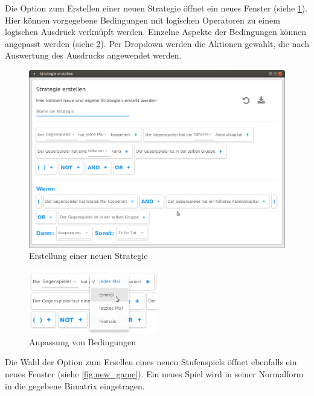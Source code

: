 \documentclass[parskip=full,11pt]{scrartcl}
\begin{document}
\newpage


Die Option zum Erstellen einer neuen \Gls{Strategie} öffnet ein neues Fenster (siehe \cref{fig:strategy}). Hier können vorgegebene Bedingungen mit logischen Operatoren zu einem logischen Ausdruck verknüpft werden. Einzelne Aspekte der Bedingungen können angepasst werden (siehe \cref{fig:strategy_drop}). Per Dropdown werden die Aktionen gewählt, die nach Auswertung des Ausdrucks angewendet werden.


\begin{figure}[hb]
	\centering
	\includegraphics[width=\textwidth]{images/strategy.png}
	\caption{\label{fig:strategy}
		Erstellung einer neuen \Gls{Strategie}}
\end{figure}


\begin{figure}[hb]
	\centering
	\includegraphics[width=0.5\textwidth]{images/strategy_drop.png}
	\caption{\label{fig:strategy_drop}
		Anpassung von Bedingungen}
\end{figure}

Die Wahl der Option zum Ersellen eines neuen \Gls{Stufenspiel}s öffnet ebenfalls ein neues Fenster (siehe \cref{fig:new_game}). Ein neues Spiel wird in seiner Normalform in die gegebene \Gls{Bimatrix} eingetragen.
\end{document}
